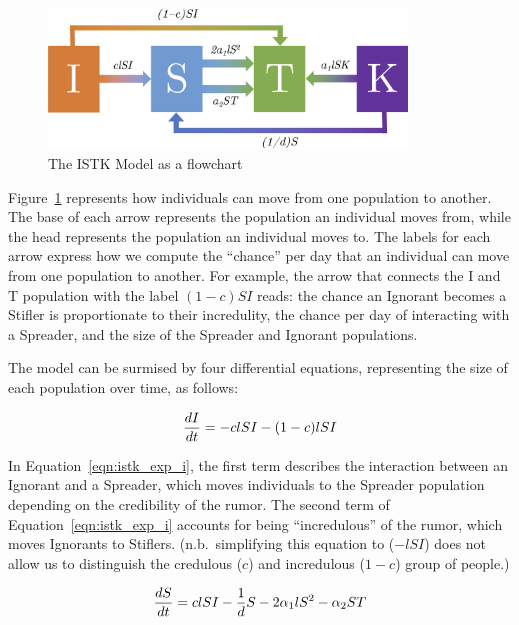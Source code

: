 \begin{figure}[H]
\captionsetup{width=0.6\textwidth}
\centering
    \includegraphics[width=0.85\textwidth]{figures/flow-chart}
  \caption{The ISTK Model as a flowchart}
\label{fig:flow-chart}
\end{figure}

Figure~\ref{fig:flow-chart} represents how individuals can move from one population to another.
The base of each arrow represents the population an individual moves from, while the head represents the population an individual moves to.
The labels for each arrow express how we compute the ``chance'' per day that an individual can move from one population to another.
For example, the arrow that connects the I and T population with the label $ (1-c)SI $ reads: the chance an Ignorant becomes a Stifler is proportionate to their incredulity, the chance per day of interacting with a Spreader, and the size of the Spreader and Ignorant populations.

The model can be surmised by four differential equations, representing the size of each population over time, as follows:

\begin{equation}
\label{eqn:istk_exp_i}
\frac{dI}{dt} = - clSI - (1-c)lSI \\
\end{equation}

\noindent In Equation~\ref{eqn:istk_exp_i}, the first term describes the interaction between an Ignorant and a Spreader, which moves individuals to the Spreader population depending on the credibility of the rumor.
 The second term of Equation~\ref{eqn:istk_exp_i} accounts for being ``incredulous'' of the rumor, which moves Ignorants to Stiflers. (n.b.\ simplifying this equation to ($-lSI$) does not allow us to distinguish the credulous ($ c $) and incredulous ($ 1 - c $) group of people.)

\begin{equation}
\label{eqn:istk_exp_s} \frac{dS}{dt} = clSI - \frac{1}{d} S - 2 \alpha_1l S^2 - \alpha_2 ST \\
\end{equation}

